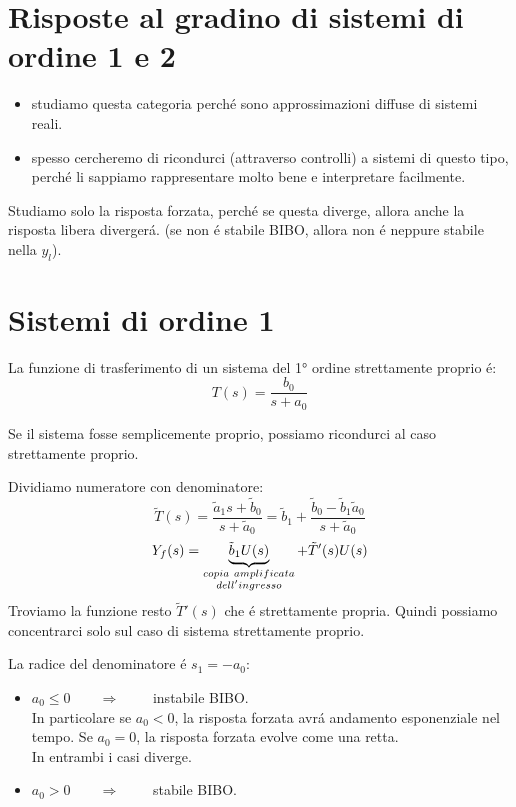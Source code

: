 \documentclass[../main.tex]{subfiles}
\begin{document}
	\section{Risposte al gradino di sistemi di ordine 1 e 2}
		\begin{itemize}
			\item
				studiamo questa categoria perch\'e sono approssimazioni diffuse di sistemi reali.
			\item
				spesso cercheremo di ricondurci (attraverso controlli) a sistemi di questo tipo, perch\'e li sappiamo rappresentare molto bene e interpretare facilmente.
		\end{itemize}
		Studiamo solo la risposta forzata, perch\'e se questa diverge, allora anche la risposta libera diverger\'a. (se non \'e stabile BIBO, allora non \'e neppure stabile nella $ y_l $).
		
	\section{Sistemi di ordine 1}	
		La funzione di trasferimento di un sistema del 1° ordine strettamente proprio \'e:
		\[
			T(s) = \frac{b_0}{s+a_0}
		\]
		
		Se il sistema fosse semplicemente proprio, possiamo ricondurci al caso strettamente proprio.
		
		Dividiamo numeratore con denominatore:
		\[
			\tilde T(s) = \frac{\tilde a_1s + \tilde b_0}{s+\tilde a_0} = \tilde b_1 + \frac{\tilde b_0 - \tilde b_1 \tilde a_0}{s+\tilde a_0}
		\]
		\[
			Y_f(s) = \underbrace{\tilde b_1 U(s)}_{\begin{subarray} ccopia\ amplificata\\ dell'ingresso \end{subarray}} + \tilde T'(s)U(s)
		\]
		Troviamo la funzione resto $ \tilde T'(s) $ che \'e strettamente propria. Quindi possiamo concentrarci solo sul caso di sistema strettamente proprio. 
		
		La radice del denominatore \'e $ s_1 = -a_0 $:
		\begin{itemize}
			\item 
				$ a_0 \leq 0 \qquad \Rightarrow \qquad $ instabile BIBO.\\
				In particolare se $ a_0 < 0 $, la risposta forzata avr\'a andamento esponenziale nel tempo. Se $ a_0 = 0 $, la risposta forzata evolve come una retta.\\
				In entrambi i casi diverge.
			\item 
				$ a_0 > 0 \qquad \Rightarrow \qquad $ stabile BIBO.
		\end{itemize} 
	
\end{document}
